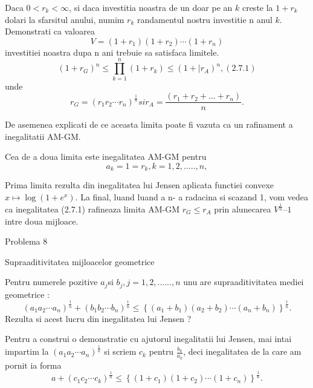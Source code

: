 \documentclass[a4paper,12pt,oneside]{report}
\begin{document}
Daca \(0< r_{k} < \infty\), si daca investitia noastra de un doar pe an \(k\) creste la \(1 +  r_{k}\) dolari la sfarsitul anului, numim \(r_{k}\) randamentul nostru investitie n anul \(k\). Demonstrati ca valoarea 
\begin{displaymath}
  V = \left ( 1 + r_{1} \right )\left ( 1 + r_{2} \right )\cdots \left ( 1 + r_{n} \right )
\end{displaymath} 
investitiei noastra dupa n ani trebuie sa satisfaca limitele. 
\begin{displaymath}
  \left ( 1 + r_{G} \right )^{n} \leq \prod_{k = 1}^{n} \left ( 1 + r_{k} \right )\leq \left ( 1 + |r_{A} \right )^{n}, (2.7.1)
\end{displaymath}
unde 
\begin{displaymath}
  r_{G} = \left ( r_{1}r_{2} \cdots r_{n}\right )^{\frac{1}{n}} si r_{A} = \frac{\left ( r_{1} + r_{2} +  ...+ r_{n}\right )}{n} .
\end{displaymath}

De asemenea explicati de ce aceasta limita poate fi vazuta ca un rafinament a inegalitatii AM-GM. 

Cea de a doua limita este inegalitatea AM-GM pentru
\begin{displaymath}
  a_{k} = 1 = r_{k}, k =1,2,.....,n,
\end{displaymath} 

Prima limita rezulta din inegalitatea lui Jensen aplicata functiei convexe \(x \mapsto \log\left ( 1 + e^{x} \right ).\) 
La final, luand luand a n- a radacina si scazand 1, vom vedea ca inegalitatea (2.7.1) rafineaza limita AM-GM  \(r_{G} \leq r_{A}\) prin alunecarea \(V^{\frac{1}{n}} – 1\) intre doua mijloace. 


Problema 8

Supraaditivitatea mijloacelor geometrice
	
Pentru numerele pozitive \(a_{j} \)si \(b_{j}, j = 1 , 2, ......,n\) unu are supraaditivitatea mediei geometrice :
\begin{displaymath}
  \left ( a_{1}a_{2}\cdots a_{n} \right )^{\frac{1}{n}} + \left ( b_{1}b_{2}\cdots b_{n} \right )^{\frac{1}{n}} \leq  \left \{ \left ( a_{1} + b_{1}\right ) \left ( a_{2} + b_{2} \right )\cdots \left ( a_{n} + b_{n} \right )\right \}^{\frac{1}{n}}. 
\end{displaymath}
	Rezulta si acest lucru din inegalitatea lui Jensen ?
	
	Pentru a construi o demonstratie cu ajutorul inegalitatii lui Jensen, mai intai impartim la 
\(\left ( a_{1}a_{2}\cdots a_{n} \right )^{\frac{1}{n}}\) si scriem \(c_{k}\) pentru \(\frac{b_{k}}{a_{k}}\), deci inegalitatea de la care am pornit ia forma 
\begin{displaymath}
  a + \left ( c_{1}c_{2} \cdots c_{k}\right )^{\frac{1}{n}}\leq \left \{ \left ( 1 + c_{1} \right )\left ( 1 + c_{2} \right )\cdots \left ( 1 + c_{n} \right ) \right \}^{\frac{1}{n}}. 
\end{displaymath}
\end{document}
